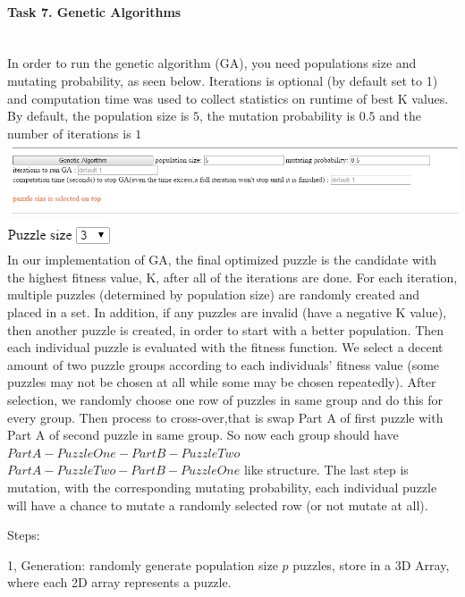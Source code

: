 \documentclass[12pt, letterpaper]{article}
\begin{document}
\pagebreak
\paragraph{Task 7. Genetic Algorithms} \mbox{}\\

In order to run the genetic algorithm (GA), you need populations size and mutating probability, as seen below. Iterations is optional (by default set to 1) and computation time was used to collect statistics on runtime of best K values. By default, the population size is $5$, the mutation probability is $0.5$ and the number of iterations is $1$ \\

\includegraphics[scale=0.6]{"Task 7/GA-section"}
\includegraphics[scale=0.6]{"Task 7/Puzzle-size"}\\

In our implementation of GA, the final optimized puzzle is the candidate with the highest fitness value, K, after all of the iterations are done. For each iteration, multiple puzzles (determined by population size) are randomly created and placed in a set. In addition, if any puzzles are invalid (have a negative K value), then another puzzle is created, in order to start with a better population. Then each individual puzzle is evaluated with the fitness function. We select a decent amount of two puzzle groups according to each individuals' fitness value (some puzzles may not be chosen at all while some may be chosen repeatedly). After selection, we randomly choose one row of puzzles in same group and do this for every group. Then process to cross-over,that is swap Part A of first puzzle with Part A of second puzzle in same group. So now each group should have $PartA-PuzzleOne-PartB-PuzzleTwo$ $PartA-PuzzleTwo-PartB-PuzzleOne$ like structure. The last step is mutation, with the corresponding mutating probability, each individual puzzle will have a chance to mutate a randomly selected row (or not mutate at all).

\bigskip
\noindent Steps:

1, Generation: randomly generate population size $p$ puzzles, store in a 3D Array, where each 2D array represents a puzzle.\\
\end{document}
